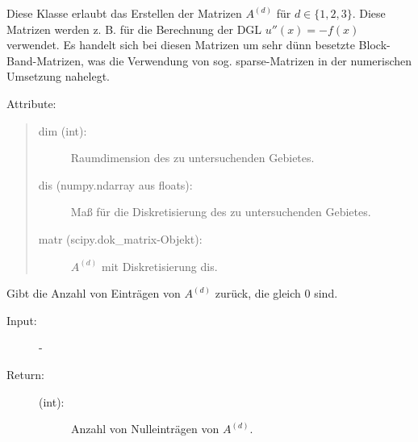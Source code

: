 \documentclass[letterpaper,10pt,ngerman, oneside, openright]{sphinxmanual}
\begin{document}
\begin{fulllineitems}
\label{\detokenize{index:sparse_erw.Sparse}}
Diese Klasse erlaubt das Erstellen der Matrizen $A^{(d)}$ für $d \in \{1,2,3\}$. Diese Matrizen werden
z. B. für die Berechnung der DGL $u''(x)=-f(x)$ verwendet. Es handelt sich bei diesen Matrizen
um sehr dünn besetzte Block-Band-Matrizen, was die Verwendung von sog. sparse-Matrizen
in der numerischen Umsetzung nahelegt.

Attribute:
\begin{quote}
\begin{description}
\item[{dim (int):}] \leavevmode
Raumdimension des zu untersuchenden Gebietes.

\item[{dis (numpy.ndarray aus floats):}] \leavevmode
Maß für die Diskretisierung des zu untersuchenden Gebietes.

\item[{matr (scipy.dok\_matrix-Objekt):}] \leavevmode
$A^{(d)}$ mit Diskretisierung dis.

\end{description}
\end{quote}

\begin{fulllineitems}
\label{\detokenize{index:sparse_erw.Sparse.anz_n_abs}}
Gibt die Anzahl von Einträgen von $A^{(d)}$ zurück, die gleich 0 sind.

\begin{description}
\item [{Input:}] -
\end{description}

\begin{description}
\item[{Return:}] \leavevmode\begin{description}
\item[{(int):}] \leavevmode
Anzahl von Nulleinträgen von $A^{(d)}$.

\end{description}

\end{description}

\end{fulllineitems}


\end{fulllineitems}
\end{document}
